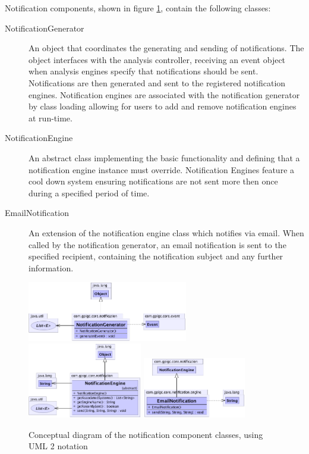 \documentclass[10pt,a4paper]{article}
\begin{document}
Notification components, shown in figure \ref{fig:notificationComponent}, 
contain the following classes:
\begin{description}
  \item [NotificationGenerator] An object that coordinates the generating and
    sending of notifications. The object interfaces with the analysis
    controller, receiving an event object when analysis engines specify that
    notifications should be sent. Notifications are then generated and sent to
    the registered notification engines. Notification engines are associated with
    the notification generator by class loading allowing for users to add and
    remove notification engines at run-time.

  \item [NotificationEngine] An abstract class implementing the basic
    functionality and defining that a notification engine instance must
    override. Notification Engines feature a cool down system ensuring 
    notifications are not sent more then once during a specified period of 
    time.

  \item [EmailNotification] An extension of the notification engine
    class which notifies via email. When called by the notification
    generator, an email notification is sent to the specified recipient, 
    containing the notification subject and any further information.
\end{description}
 
\begin{figure}[ht!]
  \centering
  \includegraphics[width= 7cm]{images/Notification/NotificationGenerator.png}
  \includegraphics[width= 5cm]{images/Notification/NotificationEngine.png}
  \includegraphics[width= 4.5cm]{images/Notification/EmailNotification.png}
  \caption{Conceptual diagram of the notification component classes, using 
UML 2 notation}
  \label{fig:notificationComponent}
\end{figure}
\end{document}
